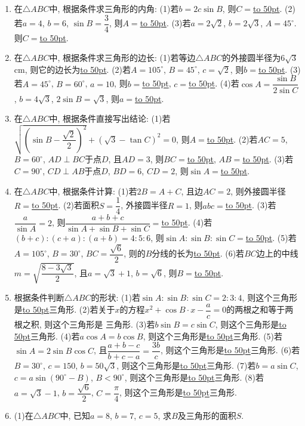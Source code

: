 \documentclass[10pt,a4paper]{article}
\newcommand{\blank}[1]{\underline{\hbox to #1pt{}}}
\begin{document}
\begin{enumerate}[1.]
(4)若$\dfrac{b-1}{c+2}=\dfrac 23$, $a=\sqrt {21}$, $A=60^{\circ}$, 则$c=$\blank{50}.
(5)若$AB=AC$, $BC-AB=2$, $\cos B=\dfrac 45$, 则$AB=$\blank{50}, $BC=$\blank{50}.
(6)若$a+b=8$, $c=7$, $C=60^{\circ}$, 则$a=$\blank{50}, $b=$\blank{50}.
(7)若三角形的面积为$\sqrt 3$, $B=60^\circ$, $b=4$, 则$a=$\blank{50}, $c=$\blank{50}.
\item 在$\triangle ABC$中, 根据条件求三角形的内角:
(1)若$b=2c\sin B$, 则$C=$\blank{50}.
(2)若$a=4$, $b=6$, $\sin B=\dfrac 34$, 则$A=$\blank{50}.
(3)若$a=2\sqrt 2$, $b=2\sqrt 3$, $A=45^\circ$. 则$C=$\blank{50}.
\item 在$\triangle ABC$中, 根据条件求三角形的边长:
(1)若等边$\triangle ABC$的外接圆半径为$6\sqrt 3$cm, 则它的边长为\blank{50}.
(2)若$A=105^\circ$, $B=45^\circ$, $c=\sqrt 2$, 则$b=$\blank{50}.
(3)若$A=45^\circ$, $B=60^{\circ}$, $a=10$, 则$b=$\blank{50}, $c=$\blank{50}.
(4)若$\cos A=\dfrac{\sin B}{2\sin C}$, $b=4\sqrt 3$, $2\sin B=\sqrt 3$, 则$a=$\blank{50}.
\item 在$\triangle ABC$中, 根据条件直接写出结论:
(1)若$\sqrt {(\sin B-\dfrac{\sqrt 2}2)^2}+(\sqrt 3-\tan C)^2=0$, 则$A=$\blank{50}.
(2)若$AC=5$, $B=60^{\circ}$, $AD\perp BC$于点$D$, 且$AD=3$, 则$BC=$\blank{50}, $AB=$\blank{50}.
(3)若$C=90^{\circ}$, $CD\perp AB$于点$D$, $BD=6$, $CD=2$, 则$\sin A=$\blank{50}.
\item 在$\triangle ABC$中, 根据条件计算:
(1)若$2B=A+C$, 且边$AC=2$, 则外接圆半径$R=$\blank{50}.
(2)若面积$S=\dfrac 14$, 外接圆半径$R=1$, 则$abc=$\blank{50}.
(3)若$\dfrac a{\sin A}=2$, 则$\dfrac{a+b+c}{\sin A+\sin B+\sin C}=$\blank{50}.
(4)若$(b+c):(c+a):(a+b)=4:5:6$, 则$\sin A:\sin B:\sin C=$\blank{50}.
(5)若$A=105^\circ$, $B=30^\circ$, $BC=\dfrac{\sqrt 6}2$, 则的$B$分线的长为\blank{50}.
(6)若$BC$边上的中线$m=\sqrt {\dfrac{8-3\sqrt 3}2}$, 且$a=\sqrt 3+1$, $b=\sqrt 6$, 则$B=$\blank{50}.
\item 根据条件判断$\triangle ABC$的形状:
(1)若$\sin A:\sin B:\sin C=2:3:4$, 则这个三角形是\blank{50}三角形.
(2)若关于$x$的方程$x^2+\cos B\cdot x-\dfrac ac=0$的两根之和等于两根之积, 则这个三角形是   三角形.
(3)若$b\sin B=c\sin C$, 则这个三角形是\blank{50}三角形.
(4)若$a\cos A=b\cos B$, 则这个三角形是\blank{50}三角形.
(5)若$\sin A=2\sin B\cos C$, 且$\dfrac{a+b-c}{b+c-a}=\dfrac{3b}c$, 则这个三角形是\blank{50}三角形.
(6)若$B=30^\circ$, $c=150$, $b=50\sqrt 3$, 则这个三角形是\blank{50}三角形.
(7)若$b=a\sin C$, $c=a\sin (90^\circ -B)$, $B<90^\circ$, 则这个三角形是\blank{50}三角形.
(8)若$a=\sqrt 3-1$, $b=\dfrac{\sqrt 6}2$, $C=\dfrac{\pi}4$, 则这个三角形是\blank{50}三角形.
\item (1)在$\triangle ABC$中, 已知$a=8$, $b=7$, $c=5$, 求$B$及三角形的面积$S$.

\end{enumerate}
\end{document}
